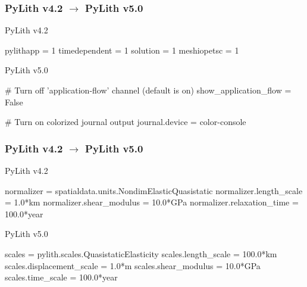 \documentclass[aspectratio=169]{beamer}
\begin{document}
\begin{frame}[t,fragile]
  \frametitle{PyLith v4.2 $\rightarrow$ PyLith v5.0}

  \begin{minipage}[t]{0.45\textwidth}
    PyLith v4.2 \\

\begin{cfgcode}
pylithapp = 1
timedependent = 1
solution = 1
meshiopetsc = 1
\end{cfgcode}
  \end{minipage}
  \hfill
  \begin{minipage}[t]{0.45\textwidth}
    PyLith v5.0 \\

\begin{cfgcode}
[pylithapp]
# Turn off 'application-flow' channel (default is on)
show_application_flow = False

# Turn on colorized journal output
journal.device = color-console
\end{cfgcode}
  \end{minipage}

\end{frame}


\begin{frame}[t,fragile]
  \frametitle{PyLith v4.2 $\rightarrow$ PyLith v5.0}


  \begin{minipage}[t]{0.45\textwidth}
    PyLith v4.2 \\

\begin{cfgcode}
  normalizer = spatialdata.units.NondimElasticQuasistatic
  normalizer.length_scale = 1.0*km
  normalizer.shear_modulus = 10.0*GPa
  normalizer.relaxation_time = 100.0*year
\end{cfgcode}
  \end{minipage}
  \hfill
  \begin{minipage}[t]{0.45\textwidth}
    PyLith v5.0 \\

\begin{cfgcode}
  scales = pylith.scales.QuasistaticElasticity
  scales.length_scale = 100.0*km
  scales.displacement_scale = 1.0*m
  scales.shear_modulus = 10.0*GPa
  scales.time_scale = 100.0*year
\end{cfgcode}

  \end{minipage}

\end{frame}
\end{document}
